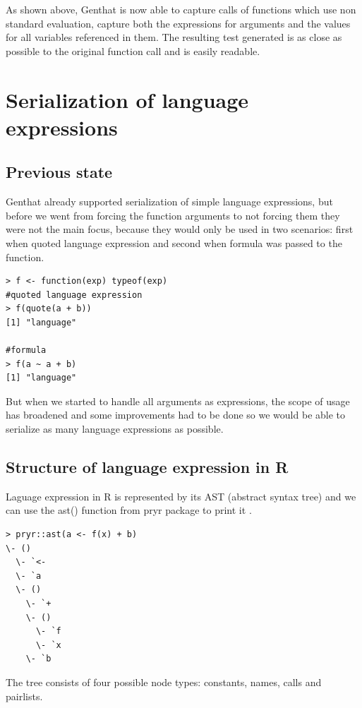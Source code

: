 \documentclass[thesis=B,english]{FITthesis}[2012/10/20]
\begin{document}
As shown above, Genthat is now able to capture calls of functions which use non standard evaluation, capture both the expressions for arguments and the values for all variables referenced in them.  The resulting test generated is as close as possible to the original function call and is easily readable. 

\chapter{Serialization of language expressions} \label{chap:expr}
\section{Previous state}
Genthat already supported serialization of simple language expressions, but before we went from forcing the function arguments to not forcing them they were not the main focus, because they would only be used in two scenarios:  first when quoted language expression and second when formula was passed to the function. 

\begin{verbatim}
> f <- function(exp) typeof(exp)
#quoted language expression
> f(quote(a + b))
[1] "language"

#formula
> f(a ~ a + b)
[1] "language"
\end{verbatim}

But when we started to handle all arguments as expressions, the scope of usage has broadened and some improvements had to be done so we would be able to serialize as many language expressions as possible.

\section{Structure of language expression in R} \label{sec:ast}
Laguage expression in R is represented by its AST (abstract syntax tree) and we can use the ast() function from pryr package to print it \cite{advR}.

\begin{minipage}{\linewidth}
\begin{verbatim}
> pryr::ast(a <- f(x) + b)
\- ()
  \- `<-
  \- `a
  \- ()
    \- `+
    \- ()
      \- `f
      \- `x
    \- `b
\end{verbatim}
\end{minipage}

The tree consists of four possible node types: constants, names, calls and pairlists.
\end{document}
